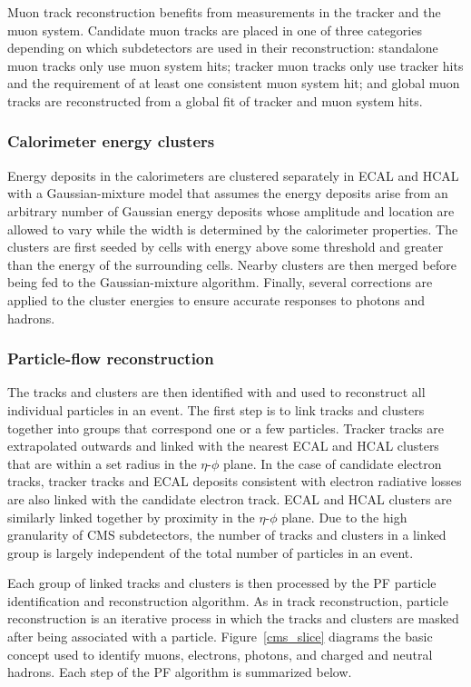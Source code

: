 Muon track reconstruction benefits from measurements in the tracker and the muon system. Candidate muon tracks are placed in one of three categories depending on which subdetectors are used in their reconstruction: standalone muon tracks only use muon system hits; tracker muon tracks only use tracker hits and the requirement of at least one consistent muon system hit; and global muon tracks are reconstructed from a global fit of tracker and muon system hits.

\subsubsection{Calorimeter energy clusters}
Energy deposits in the calorimeters are clustered separately in ECAL and HCAL with a Gaussian-mixture model that assumes the energy deposits arise from an arbitrary number of Gaussian energy deposits whose amplitude and location are allowed to vary while the width is determined by the calorimeter properties. The clusters are first seeded by cells with energy above some threshold and greater than the energy of the surrounding cells. Nearby clusters are then merged before being fed to the Gaussian-mixture algorithm. Finally, several corrections are applied to the cluster energies to ensure accurate responses to photons and hadrons.

\subsubsection{Particle-flow reconstruction}
The tracks and clusters are then identified with and used to reconstruct all individual particles in an event. The first step is to link tracks and clusters together into groups that correspond one or a few particles. Tracker tracks are extrapolated outwards and linked with the nearest ECAL and HCAL clusters that are within a set radius in the $\eta$-$\phi$ plane. In the case of candidate electron tracks, tracker tracks and ECAL deposits consistent with electron radiative losses are also linked with the candidate electron track. ECAL and HCAL clusters are similarly linked together by proximity in the $\eta$-$\phi$ plane. Due to the high granularity of CMS subdetectors, the number of tracks and clusters in a linked group is largely independent of the total number of particles in an event.

Each group of linked tracks and clusters is then processed by the PF particle identification and reconstruction algorithm. As in track reconstruction, particle reconstruction is an iterative process in which the tracks and clusters are masked after being associated with a particle. Figure~\ref{cms_slice} diagrams the basic concept used to identify muons, electrons, photons, and charged and neutral hadrons. Each step of the PF algorithm is summarized below.

